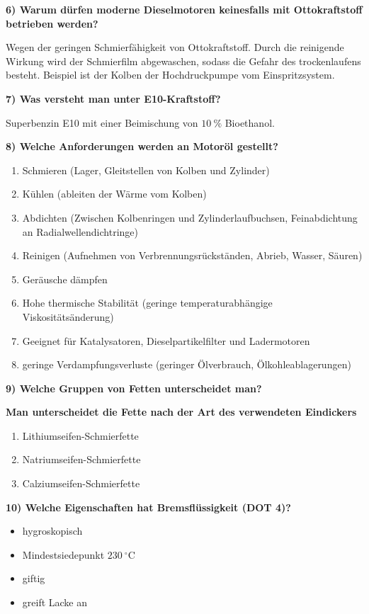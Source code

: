 \textbf{6) Warum dürfen moderne Dieselmotoren keinesfalls mit
Ottokraftstoff betrieben werden?}

Wegen der geringen Schmierfähigkeit von Ottokraftstoff. Durch die
reinigende Wirkung wird der Schmierfilm abgewaschen, sodass die Gefahr
des trockenlaufens besteht. Beispiel ist der Kolben der Hochdruckpumpe
vom Einspritzsystem.

\textbf{7) Was versteht man unter E10-Kraftstoff?}

Superbenzin E10 mit einer Beimischung von $10~\%$ Bioethanol.

\textbf{8) Welche Anforderungen werden an Motoröl gestellt?}

\begin{enumerate}
\item
  Schmieren (Lager, Gleitstellen von Kolben und Zylinder)
\item
  Kühlen (ableiten der Wärme vom Kolben)
\item
  Abdichten (Zwischen Kolbenringen und Zylinderlaufbuchsen,
  Feinabdichtung an Radialwellendichtringe)
\item
  Reinigen (Aufnehmen von Verbrennungsrückständen, Abrieb, Wasser,
  Säuren)
\item
  Geräusche dämpfen
\item
  Hohe thermische Stabilität (geringe temperaturabhängige
  Viskositätsänderung)
\item
  Geeignet für Katalysatoren, Dieselpartikelfilter und Ladermotoren
\item
  geringe Verdampfungsverluste (geringer Ölverbrauch,
  Ölkohleablagerungen)
\end{enumerate}

\textbf{9) Welche Gruppen von Fetten unterscheidet man?}

\textbf{Man unterscheidet die Fette nach der Art des verwendeten
Eindickers}

\begin{enumerate}
\item
  Lithiumseifen-Schmierfette
\item
  Natriumseifen-Schmierfette
\item
  Calziumseifen-Schmierfette
\end{enumerate}

\textbf{10) Welche Eigenschaften hat Bremsflüssigkeit (DOT 4)?}

\begin{itemize}
\item
  hygroskopisch
\item
  Mindestsiedepunkt $230~^\circ\text{C}$
\item
  giftig
\item
  greift Lacke an
\end{itemize}
